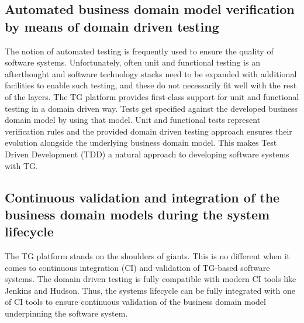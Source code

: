 \documentclass[a4paper,12pt,oneside,openright,final]{memoir} %
\begin{document}
\subsection*{Automated business domain model verification by means of domain driven testing}
	The notion of automated testing is frequently used to ensure the quality of software systems.
	Unfortunately, often unit and functional testing is an afterthought and software technology stacks need to be expanded with additional facilities to enable such testing, and these do not necessarily fit well with the rest of the layers.
	The TG platform provides first-class support for unit and functional testing in a domain driven way.
	Tests get specified against the developed business domain model by using that model.
	Unit and functional tests represent verification rules and the provided domain driven testing approach ensures their evolution alongside the underlying business domain model.
	This makes Test Driven Development (TDD) a natural approach to developing software systems with TG.
	
\subsection*{Continuous validation and integration of the business domain models during the system lifecycle}
	The TG platform stands on the shoulders of giants.
	This is no different when it comes to continuous integration (CI) and validation of TG-based software systems.
	The domain driven testing is fully compatible with modern CI tools like Jenkins and Hudson.
	Thus, the systems lifecycle can be fully integrated with one of CI tools to ensure continuous validation of the business domain model underpinning the software system.
\end{document}
